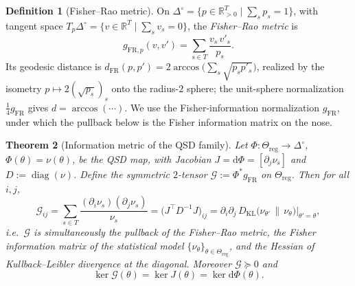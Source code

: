\documentclass[11pt,reqno]{amsart}
\theoremstyle{plain}
\newtheorem{theorem}{Theorem}[section]
\theoremstyle{definition}
\newtheorem{definition}[theorem]{Definition}
\theoremstyle{remark}
\newcommand{\R}{\mathbb{R}}
\newcommand{\Reg}{\Theta_{\mathrm{reg}}}
\newcommand{\Simp}{\Delta^{\!\circ}}
\newcommand{\KL}{D_{\mathrm{KL}}}
\newcommand{\FR}{\mathrm{FR}}
\newcommand{\dd}{\mathrm{d}}
\DeclareMathOperator{\diag}{diag}
\begin{document}
\begin{definition}[Fisher--Rao metric]\label{def:fr}
On $\Simp=\{p\in\R^{T}_{>0}\mid\sum_sp_s=1\}$, with tangent space
$T_p\Simp=\{v\in\R^{T}\mid\sum_sv_s=0\}$, the \emph{Fisher--Rao metric} is
\[
g_{\FR,p}(v,v')=\sum_{s\in T}\frac{v_s\,v'_s}{p_s}.
\]
Its geodesic distance is $d_{\FR}(p,p')=2\arccos\!\bigl(\sum_s\sqrt{p_sp'_s}\bigr)$,
realized by the isometry $p\mapsto2(\sqrt{p_s})_s$ onto the radius-$2$ sphere; the
unit-sphere normalization $\tfrac14 g_{\FR}$ gives $d=\arccos(\cdots)$. We use the
Fisher-information normalization $g_{\FR}$, under which the pullback below is the
Fisher information matrix on the nose.
\end{definition}

\begin{theorem}[Information metric of the QSD family]\label{thm:fisher}
Let $\Phi\colon\Reg\to\Simp$, $\Phi(\theta)=\nu(\theta)$, be the QSD map, with Jacobian
$J=\dd\Phi=[\partial_j\nu_s]$ and $D:=\diag(\nu)$. Define the symmetric
$2$-tensor $\mathcal G:=\Phi^{*}g_{\FR}$ on $\Reg$. Then for all $i,j$,
\begin{equation}\label{eq:fisher}
\mathcal G_{ij}
=\sum_{s\in T}\frac{(\partial_i\nu_s)(\partial_j\nu_s)}{\nu_s}
=\bigl(J^{\top}D^{-1}J\bigr)_{ij}
=\partial_i\partial_j\,\KL\!\bigl(\nu_{\theta'}\,\big\|\,\nu_{\theta}\bigr)\Big|_{\theta'=\theta},
\end{equation}
i.e.\ $\mathcal G$ is simultaneously the pullback of the Fisher--Rao metric, the
Fisher information matrix of the statistical model $\{\nu_\theta\}_{\theta\in\Reg}$,
and the Hessian of Kullback--Leibler divergence at the diagonal. Moreover
$\mathcal G\succeq0$ and
\[
\ker\mathcal G(\theta)=\ker J(\theta)=\ker\dd\Phi(\theta).
\]
\end{theorem}
\end{document}

